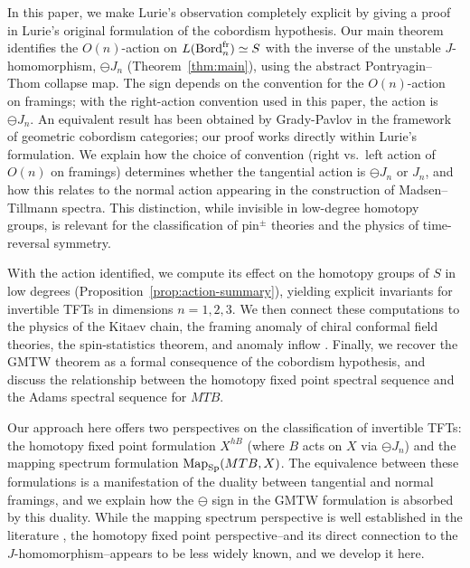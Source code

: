 \documentclass{amsart}
\begin{document}
In this paper, we make Lurie's observation completely explicit by giving a proof in Lurie's original formulation of the cobordism hypothesis. Our main theorem identifies the $O(n)$-action on $L(\operatorname{Bord}_n^{\mathrm{fr}}) \simeq S$ with the inverse of the unstable $J$-homomorphism, $\ominus J_n$ (Theorem~\ref{thm:main}), using the abstract Pontryagin--Thom collapse map. The sign depends on the convention for the $O(n)$-action on framings; with the right-action convention used in this paper, the action is $\ominus J_n$. An equivalent result has been obtained by Grady-Pavlov \cite[Theorem 5.0.6]{grady2021geometric} in the framework of geometric cobordism categories; our proof works directly within Lurie's formulation. We explain how the choice of convention (right vs.\ left action of $O(n)$ on framings) determines whether the tangential action is $\ominus J_n$ or $J_n$, and how this relates to the normal action appearing in the construction of Madsen--Tillmann spectra. This distinction, while invisible in low-degree homotopy groups, is relevant for the classification of pin$^\pm$ theories and the physics of time-reversal symmetry.

With the action identified, we compute its effect on the homotopy groups of $S$ in low degrees (Proposition~\ref{prop:action-summary}), yielding explicit invariants for invertible TFTs in dimensions $n = 1, 2, 3$. We then connect these computations to the physics of the Kitaev chain, the framing anomaly of chiral conformal field theories, the spin-statistics theorem, and anomaly inflow \cite{witten1989quantum, witten1992holomorphic, freed2021reflection}. Finally, we recover the GMTW theorem as a formal consequence of the cobordism hypothesis, and discuss the relationship between the homotopy fixed point spectral sequence and the Adams spectral sequence for $MTB$.

Our approach here offers two perspectives on the classification of invertible TFTs: the homotopy fixed point formulation $X^{hB}$ (where $B$ acts on $X$ via $\ominus J_n$) and the mapping spectrum formulation $\operatorname{Map}_{\operatorname{Sp}}(MTB, X)$. The equivalence between these formulations is a manifestation of the duality between tangential and normal framings, and we explain how the $\ominus$ sign in the GMTW formulation is absorbed by this duality. While the mapping spectrum perspective is well established in the literature \cite{MR2506750, MR4821355}, the homotopy fixed point perspective--and its direct connection to the $J$-homomorphism--appears to be less widely known, and we develop it here.
\end{document}
